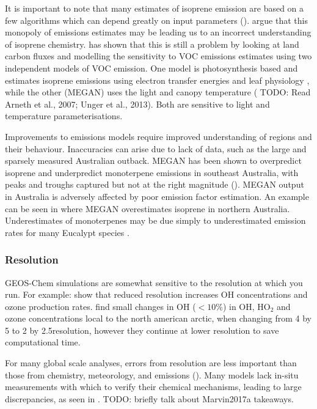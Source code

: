       It is important to note that many estimates of isoprene emission are based on a few algorithms which can depend greatly on input parameters (\cite{Arneth2008,Niinemets2010}).
      \cite{Arneth2008} argue that this monopoly of emissions estimates may be leading us to an incorrect understanding of isoprene chemistry.
      \cite{Yue2015} has shown that this is still a problem by looking at land carbon fluxes and modelling the sensitivity to VOC emissions estimates using two independent models of VOC emission.
      One model is photosynthesis based and estimates isoprene emissions using electron transfer energies and leaf physiology \citep{Niinemets1999}, while the other (MEGAN) uses the light and canopy temperature (\citep{Guenther1995,Arneth2007} TODO: Read Arneth et al., 2007; Unger et al., 2013).
      Both are sensitive to light and temperature parameterisations.
      
      Improvements to emissions models require improved understanding of regions and their behaviour.
      Inaccuracies can arise due to lack of data, such as the large and sparsely measured Australian outback.
      MEGAN has been shown to overpredict isoprene and underpredict monoterpene emissions in southeast Australia, with peaks and troughs captured but not at the right magnitude (\cite{Emmerson2016}).
      MEGAN output in Australia is adversely affected by poor emission factor estimation. 
      An example can be seen in \citet{Muller2008} where MEGAN overestimates isoprene in northern Australia.
      Underestimates of monoterpenes may be due simply to underestimated emission rates for many Eucalypt species \citep{Winters2009}.
    
    \subsubsection{Resolution}
      \label{LR:Models:Uncert:Resolution}
      GEOS-Chem simulations are somewhat sensitive to the resolution at which you run.
      For example: \cite{Wild2006} show that reduced resolution increases OH concentrations and ozone production rates.
      \cite{Christian2017} find small changes in OH ($<10$\%) in OH, HO$_2$ and ozone concentrations local to the north american arctic, when changing from 4 by 5 to 2 by 2.5\degr resolution, however they continue at lower resolution to save computational time.
    
      For many global scale analyses, errors from resolution are less important than those from chemistry, meteorology, and emissions (\cite{Christian2017}).
      Many models lack in-situ measurements with which to verify their chemical mechanisms, leading to large discrepancies, as seen in \cite{Marvin2017a}.
      TODO: briefly talk about Marvin2017a takeaways.
    
